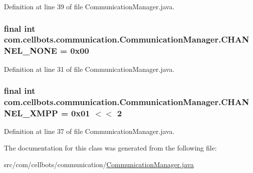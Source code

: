 Definition at line 39 of file Communication\-Manager.\-java.

\hypertarget{classcom_1_1cellbots_1_1communication_1_1_communication_manager_ae97b5a5fc1d236a007c443c8fd62439e}{
\subsubsection[{C\-H\-A\-N\-N\-E\-L\-\_\-\-N\-O\-N\-E}]{\setlength{\rightskip}{0pt plus 5cm}final int {\bf com.\-cellbots.\-communication.\-Communication\-Manager.\-C\-H\-A\-N\-N\-E\-L\-\_\-\-N\-O\-N\-E} = 0x00}}\label{classcom_1_1cellbots_1_1communication_1_1_communication_manager_ae97b5a5fc1d236a007c443c8fd62439e}


Definition at line 31 of file Communication\-Manager.\-java.

\hypertarget{classcom_1_1cellbots_1_1communication_1_1_communication_manager_a4d449547286440b770e3e66514070702}{
\subsubsection[{C\-H\-A\-N\-N\-E\-L\-\_\-\-X\-M\-P\-P}]{\setlength{\rightskip}{0pt plus 5cm}final int {\bf com.\-cellbots.\-communication.\-Communication\-Manager.\-C\-H\-A\-N\-N\-E\-L\-\_\-\-X\-M\-P\-P} = 0x01 $<$$<$ 2}}\label{classcom_1_1cellbots_1_1communication_1_1_communication_manager_a4d449547286440b770e3e66514070702}


Definition at line 37 of file Communication\-Manager.\-java.



The documentation for this class was generated from the following file\-:\begin{DoxyCompactItemize}
\item 
src/com/cellbots/communication/\hyperlink{_communication_manager_8java}{Communication\-Manager.\-java}\end{DoxyCompactItemize}
